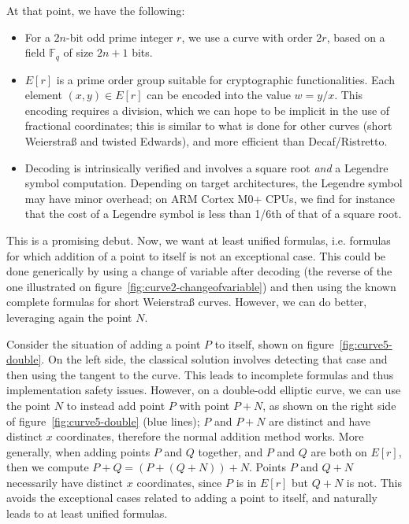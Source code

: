 \documentclass{llncs}
\newcommand{\bF}{\mathbb{F}}
\begin{document}
At that point, we have the following:
\begin{itemize}

    \item For a $2n$-bit odd prime integer $r$, we use a curve with
    order $2r$, based on a field $\bF_q$ of size $2n+1$ bits.

    \item $E[r]$ is a prime order group suitable for cryptographic
    functionalities. Each element $(x, y) \in E[r]$ can be encoded into
    the value $w = y/x$. This encoding requires a division, which we
    can hope to be implicit in the use of fractional coordinates; this
    is similar to what is done for other curves (short Weierstraß and
    twisted Edwards), and more efficient than Decaf/Ristretto.

    \item Decoding is intrinsically verified and involves a square root
    \emph{and} a Legendre symbol computation. Depending on target
    architectures, the Legendre symbol may have minor overhead; on ARM
    Cortex M0+ CPUs, we find for instance that the cost of a Legendre
    symbol is less than 1/6th of that of a square root\cite{Por2020-4}.

\end{itemize}

This is a promising debut. Now, we want at least unified formulas, i.e.
formulas for which addition of a point to itself is not an exceptional
case. This could be done generically by using a change of variable after
decoding (the reverse of the one illustrated on
figure~\ref{fig:curve2-changeofvariable}) and then using the known
complete formulas for short Weierstraß curves\cite{RenCosBat2015}.
However, we can do better, leveraging again the point $N$.

Consider the situation of adding a point $P$ to itself, shown on
figure~\ref{fig:curve5-double}. On the left side, the classical solution
involves detecting that case and then using the tangent to the curve.
This leads to incomplete formulas and thus implementation safety issues.
However, on a double-odd elliptic curve, we can use the point $N$ to
instead add point $P$ with point $P+N$, as shown on the right side of
figure~\ref{fig:curve5-double} (blue lines); $P$ and $P+N$ are distinct
and have distinct $x$ coordinates, therefore the normal addition method
works. More generally, when adding points $P$ and $Q$ together, and $P$
and $Q$ are both on $E[r]$, then we compute $P + Q = (P + (Q + N)) + N$.
Points $P$ and $Q+N$ necessarily have distinct $x$ coordinates, since
$P$ is in $E[r]$ but $Q+N$ is not. This avoids the exceptional cases
related to adding a point to itself, and naturally leads to at least
unified formulas.
\end{document}
